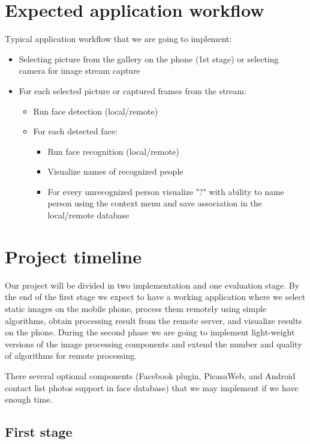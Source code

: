 \documentclass[conference]{IEEEtran}
\begin{document}
\section{Expected application workflow}

Typical application workflow that we are going to implement:

\begin{itemize}
	\item Selecting picture from the gallery on the phone (1st stage) or selecting camera for image stream capture
	\item For each selected picture or captured frames from the stream:
	\begin{itemize}
		\item Run face detection (local/remote)
		\item For each detected face:
		\begin{itemize}
			\item Run face recognition (local/remote)
			\item Visualize names of recognized people
			\item For every unrecognized person visualize "?" with ability to name person using the context menu and save association in the local/remote database
		\end{itemize}
	\end{itemize}
\end{itemize}

\section{Project timeline}

Our project will be divided in two implementation and one evaluation stage. By the end of the first stage we expect to have a working application where we select static images on the mobile phone, process them remotely using simple algorithms, obtain processing result from the remote server, and visualize results on the phone. During the second phase we are going to implement light-weight versions of the image processing components and extend the number and quality of algorithms for remote processing.

There several optional components (Facebook plugin, PicasaWeb, and Android contact list photos support in face database) that we may implement if we have enough time.

\subsection{First stage}
\end{document}
